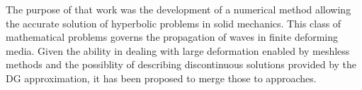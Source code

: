 The purpose of that work was the development of a numerical method allowing the accurate solution of hyperbolic problems in solid mechanics.
This class of mathematical problems governs the propagation of waves in finite deforming media.
Given the ability in dealing with large deformation enabled by meshless methods and the possiblity of describing discontinuous solutions provided by the DG approximation, it has been proposed to merge those to approaches.











